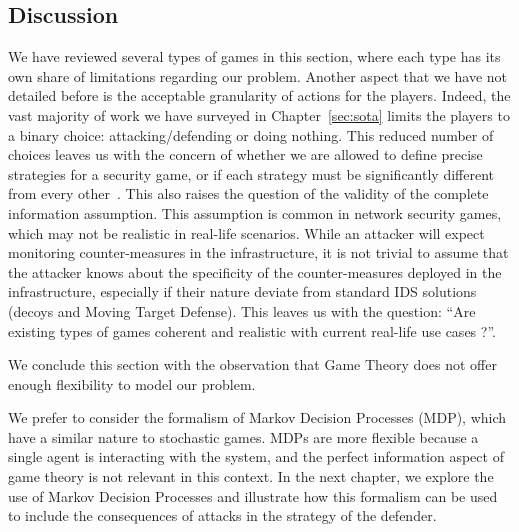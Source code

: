\subsection{Discussion}
We have reviewed several types of games in this section, where each type has its own share of limitations regarding our problem. Another aspect that we have not detailed before is the acceptable granularity of actions for the players. Indeed, the vast majority of work we have surveyed in Chapter~\ref{sec:sota} limits the players to a binary choice: attacking/defending or doing nothing. This reduced number of choices leaves us with the concern of whether we are allowed to define precise strategies for a security game, or if each strategy must be significantly different from every other~\cite{Kiennert2018}. 
This also raises the question of the validity of the complete information assumption.
This assumption is common in network security games, which may not be realistic in real-life scenarios.
While an attacker will expect monitoring counter-measures in the infrastructure, it is not trivial to assume that the attacker knows about the specificity of the counter-measures deployed in the infrastructure, especially if their nature deviate from standard IDS solutions (\eg decoys and Moving Target Defense).
This leaves us with the question: ``Are existing types of games coherent and realistic with current real-life use cases ?''.

We conclude this section with the observation that Game Theory does not offer enough flexibility to model our problem. 

We prefer to consider the formalism of Markov Decision Processes (MDP), which have a similar nature to stochastic games. MDPs are more flexible because a single agent is interacting with the system, and the perfect information aspect of game theory is not relevant in this context. 
In the next chapter, we explore the use of Markov Decision Processes and illustrate how this formalism can be used to include the consequences of attacks in the strategy of the defender.
